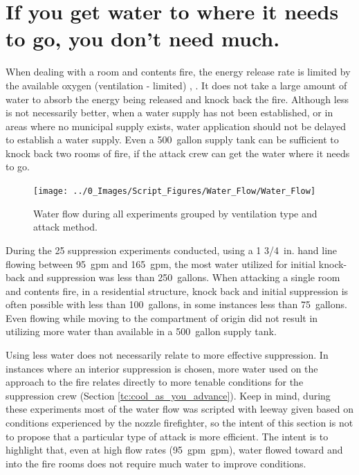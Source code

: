 \documentclass[12pt,oneside]{book}
\begin{document}
\section{If you get water to where it needs to go, you don't need much.} \label{tc:water_where_it_needs_to_go}
When dealing with a room and contents fire, the energy release rate is limited by the available oxygen (ventilation - limited) \cite{DHS2008}, \cite{DHS2010}. It does not take a large amount of water to absorb the energy being released and knock back the fire. Although less is not necessarily better, when a water supply has not been established, or in areas where no municipal supply exists, water application should not be delayed to establish a water supply. Even a 500~gallon supply tank can be sufficient to knock back two rooms of fire, if the attack crew can get the water where it needs to go.    

\begin{figure}[H]
\centering
\texttt{[image: ../0\_Images/Script\_Figures/Water\_Flow/Water\_Flow]}
\caption[Water Flow All Experiments]{Water flow during all experiments grouped by ventilation type and attack method.}
\label{fig:water_amount_TC_all}
\end{figure}

During the 25 suppression experiments conducted, using a 1 3/4~in. hand line flowing between 95~gpm and 165~gpm, the most water utilized for initial knock-back and suppression was less than 250~gallons. When attacking a single room and contents fire, in a residential structure, knock back and initial suppression is often possible with less than 100~gallons, in some instances less than 75~gallons. Even flowing while moving to the compartment of origin did not result in utilizing more water than available in a 500~gallon supply tank.  

Using less water does not necessarily relate to more effective suppression. In instances where an interior suppression is chosen, more water used on the approach to the fire relates directly to more tenable conditions for the suppression crew (Section \ref{tc:cool_as_you_advance}). Keep in mind, during these experiments most of the water flow was scripted with leeway given based on conditions experienced by the nozzle firefighter, so the intent of this section is not to propose that a particular type of attack is more efficient. The intent is to highlight that, even at high flow rates (95~gpm~gpm), water flowed toward and into the fire rooms does not require much water to improve conditions.
\end{document}
